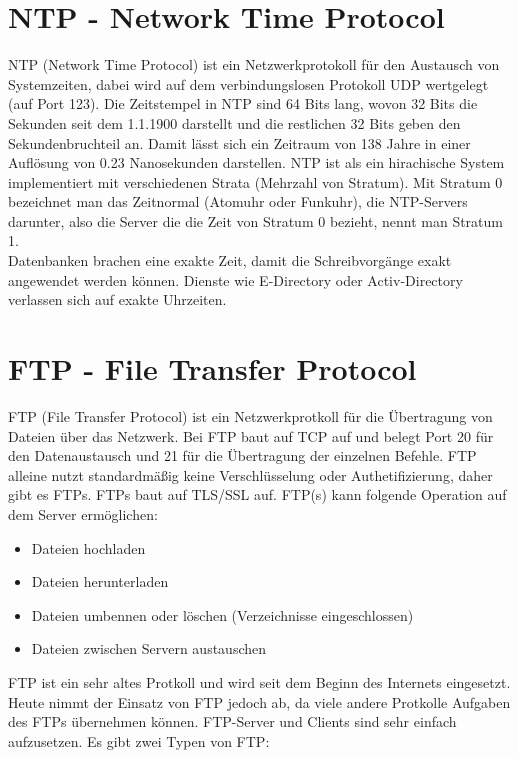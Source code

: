 \documentclass[a4paper]{article}
\begin{document}
\section{NTP - Network Time Protocol}

NTP (Network Time Protocol) ist ein Netzwerkprotokoll für den Austausch von Systemzeiten, dabei wird auf dem verbindungslosen Protokoll UDP wertgelegt (auf Port 123). Die Zeitstempel in NTP sind 64 Bits lang, wovon 32 Bits die Sekunden seit dem 1.1.1900 darstellt und die restlichen 32 Bits geben den Sekundenbruchteil an. Damit lässt sich ein Zeitraum von 138 Jahre in einer Auflösung von 0.23 Nanosekunden darstellen. NTP ist als ein hirachische System implementiert mit verschiedenen Strata (Mehrzahl von Stratum). Mit Stratum 0 bezeichnet man das Zeitnormal (Atomuhr oder Funkuhr), die NTP-Servers darunter, also die Server die die Zeit von Stratum 0 bezieht, nennt man Stratum 1.\\
Datenbanken brachen eine exakte Zeit, damit die Schreibvorgänge exakt angewendet werden können. Dienste wie E-Directory oder Activ-Directory verlassen sich auf exakte Uhrzeiten.

\newpage
\section{FTP - File Transfer Protocol}

FTP (File Transfer Protocol) ist ein Netzwerkprotkoll für die Übertragung von Dateien über das Netzwerk. Bei FTP baut auf TCP auf und belegt Port 20 für den Datenaustausch und 21 für die Übertragung der einzelnen Befehle. FTP alleine nutzt standardmäßig keine Verschlüsselung oder Authetifizierung, daher gibt es FTPs. FTPs baut auf TLS/SSL auf. FTP(s) kann folgende Operation auf dem Server ermöglichen:

\begin{itemize}
\item Dateien hochladen
\item Dateien herunterladen
\item Dateien umbennen oder löschen (Verzeichnisse eingeschlossen)
\item Dateien zwischen Servern austauschen
\end{itemize}

FTP ist ein sehr altes Protkoll und wird seit dem Beginn des Internets eingesetzt. Heute nimmt der Einsatz von FTP jedoch ab, da viele andere Protkolle Aufgaben des FTPs übernehmen können. FTP-Server und Clients sind sehr einfach aufzusetzen.
Es gibt zwei Typen von FTP:
\end{document}
